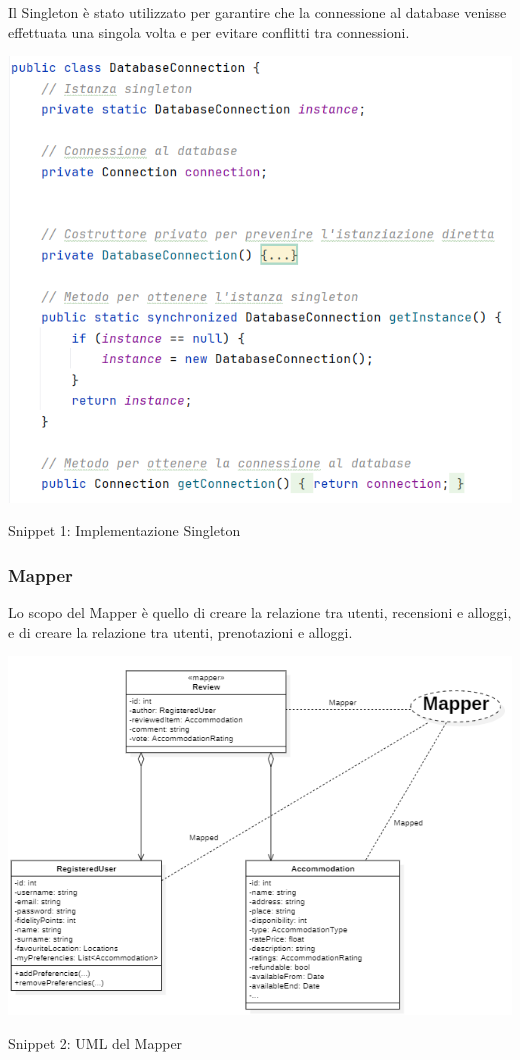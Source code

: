 \documentclass[10pt]{article}
\begin{document}
Il Singleton è stato utilizzato per garantire che la connessione al database venisse effettuata una singola volta e per evitare conflitti tra connessioni.
\par\medskip
\vspace{-0.3cm}
\begin{center}
\includegraphics[scale=0.65]{Snippets/Singleton}
\par\medskip
Snippet 1: Implementazione Singleton
\par\medskip
\end{center}

\subsubsection{Mapper}

Lo scopo del Mapper è quello di creare la relazione tra utenti, recensioni e alloggi, e di creare la relazione tra utenti, prenotazioni e alloggi.

\begin{center}
\includegraphics[scale=0.77]{Snippets/Mapper}
\par\medskip
Snippet 2: UML del Mapper
\par\medskip
\end{center}
\end{document}
